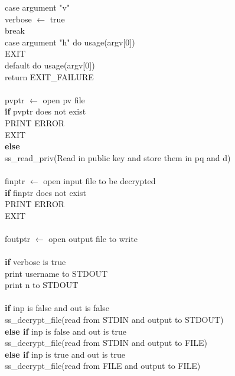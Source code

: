 \documentclass[12pt]{article}
\begin{document}
\indent \indent \indent case argument "v" \\
\indent \indent \indent \indent verbose $\leftarrow$ true \\
\indent \indent \indent \indent break \\
\indent \indent \indent case argument "h" do usage(argv[0]) \\
\indent \indent \indent \indent EXIT \\
\indent \indent \indent default do usage(argv[0]) \\
\indent \indent \indent \indent return EXIT\_FAILURE \\
\\
\indent pvptr $\leftarrow$ open pv file\\
\indent \indent \textbf{if} pvptr does not exist \\
\indent \indent \indent PRINT ERROR \\
\indent \indent \indent EXIT \\
\indent \indent \textbf{else} \\
\indent \indent \indent ss\_read\_priv(Read in public key and store them in pq and d) \\
\\
\indent finptr $\leftarrow$ open input file to be decrypted\\
\indent \indent \textbf{if} finptr does not exist \\
\indent \indent \indent PRINT ERROR \\
\indent \indent \indent EXIT \\
\\
\indent foutptr $\leftarrow$ open output file to write\\
\\
\indent \textbf{if} verbose is true \\
\indent \indent print username to STDOUT\\
\indent \indent print n to STDOUT \\
\\
\indent \textbf{if} inp is false and out is false \\
\indent\indent ss\_decrypt\_file(read from STDIN and output to STDOUT) \\
\indent \textbf{else if} inp is false and out is true \\
\indent\indent ss\_decrypt\_file(read from STDIN and output to FILE) \\
\indent \textbf{else if} inp is true and out is true \\
\indent\indent ss\_decrypt\_file(read from FILE and output to FILE) \\
\end{document}
